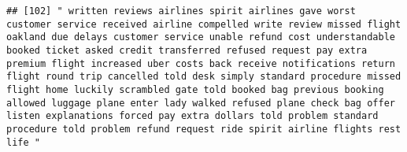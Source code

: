 \documentclass[
]{article}
\begin{document}
\begin{verbatim}
## [102] " written reviews airlines spirit airlines gave worst customer service received airline compelled write review missed flight oakland due delays customer service unable refund cost understandable booked ticket asked credit transferred refused request pay extra premium flight increased uber costs back receive notifications return flight round trip cancelled told desk simply standard procedure missed flight home luckily scrambled gate told booked bag previous booking allowed luggage plane enter lady walked refused plane check bag offer listen explanations forced pay extra dollars told problem standard procedure told problem refund request ride spirit airline flights rest life "                                                                                                                                                                                                                                                                                                                                                                                                                                                                                                                                                                                                                                                                                                                                                                                                                                                                                                                                                                                                                                                                                     

\end{verbatim}
\end{document}
